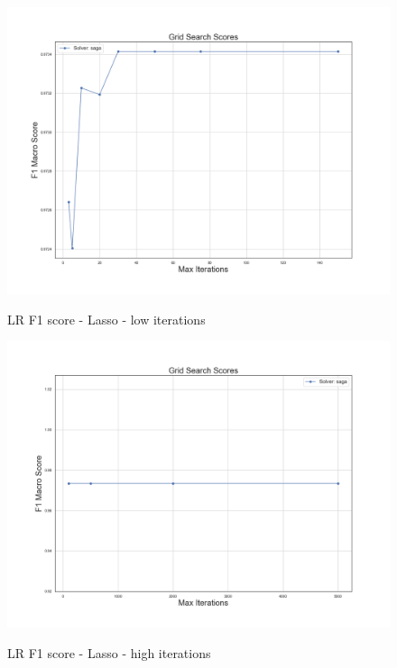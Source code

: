 \begin{figure}
	\begin{multicols}{2}
		\includegraphics[width=\linewidth]{chapter5/figure/logreg_l1_close.png}\par 
		\caption{LR F1 score - Lasso - low iterations}
		\label{fig:lr_lasso_close}
		\includegraphics[width=\linewidth]{chapter5/figure/logreg_l1_far.png}\par 
		\caption{LR F1 score - Lasso - high iterations}
		\label{fig:lr_lasso_far}
	\end{multicols}
	\begin{multicols}{2}

\end{multicols}
\end{figure}
